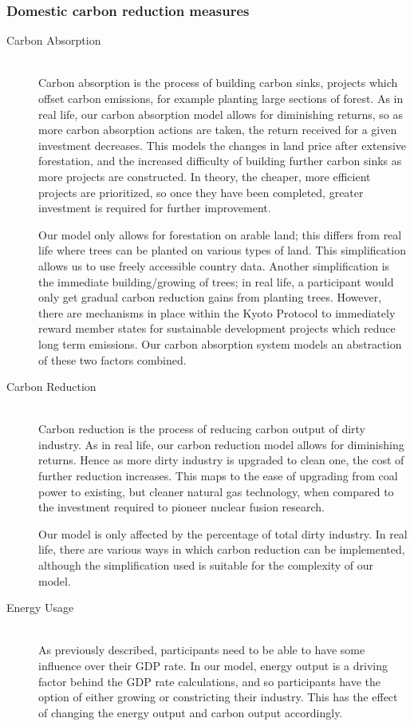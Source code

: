 \subsubsection{Domestic carbon reduction measures}
\begin{description}
	\item [Carbon Absorption] \hfill \\ Carbon absorption is the process of building carbon sinks, projects which offset carbon emissions, for example planting large sections of forest. As in real life, our carbon absorption model allows for diminishing returns, so as more carbon absorption actions are taken, the return received for a given investment decreases. This models the changes in land price after extensive forestation, and the increased difficulty of building further carbon sinks as more projects are constructed. In theory, the cheaper, more efficient projects are prioritized, so once they have been completed, greater investment is required for further improvement.

Our model only allows for forestation on arable land; this differs from real life where trees can be planted on various types of land. This simplification allows us to use freely accessible country data. Another simplification is the immediate building/growing of trees; in real life, a participant would only get gradual carbon reduction gains from planting trees. However, there are mechanisms in place within the Kyoto Protocol to immediately reward member states for sustainable development projects which reduce long term emissions. Our carbon absorption system models an abstraction of these two factors combined. 
	\item [Carbon Reduction] \hfill \\ Carbon reduction is the process of reducing carbon output of dirty industry. As in real life, our carbon reduction model allows for diminishing returns. Hence as more dirty industry is upgraded to clean one, the cost of further reduction increases. This maps to the ease of upgrading from coal power to existing, but cleaner natural gas technology, when compared to the investment required to pioneer nuclear fusion research.

Our model is only affected by the percentage of total dirty industry. In real life, there are various ways in which carbon reduction can be implemented, although the simplification used is suitable for the complexity of our model.
	\item [Energy Usage] \hfill \\ As previously described, participants need to be able to have some influence over their GDP rate. In our model, energy output is a driving factor behind the GDP rate calculations, and so participants have the option of either growing or constricting their industry. This has the effect of changing the energy output and carbon output accordingly.


\end{description}
